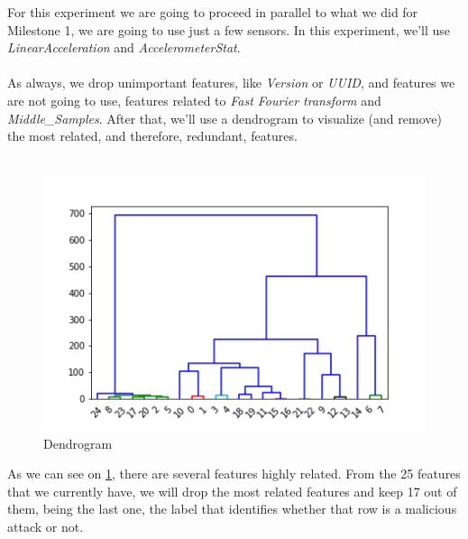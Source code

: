 \documentclass[idxtotoc,hyperref,openany]{labbook} %
\begin{document}

For this experiment we are going to proceed in parallel to what we did for Milestone 1, we are going to use just a few sensors. In this experiment, we'll use \textit{LinearAcceleration} and \textit{AccelerometerStat}.\\\\
As always, we drop unimportant features, like \textit{Version} or \textit{UUID}, and features we are not going to use, features related to \textit{Fast Fourier transform} and \textit{Middle\_Samples}. After that, we'll use a dendrogram to visualize (and remove) the most related, and therefore, redundant, features.\\\\

\begin{figure}[h]
\includegraphics[width=0.9\linewidth]{Milestone3/Drendrogram_accelerometer.png}
\setlength\belowcaptionskip{-10pt}
\caption{Dendrogram}
\label{Milestone 3 Accelerometer Dendrogram}
\end{figure}

As we can see on \ref{Milestone 3 Accelerometer Dendrogram}, there are several features highly related. From the 25 features that we currently have, we will drop the most related features and keep 17 out of them, being the last one, the label that identifies whether that row is a malicious attack or not.
\end{document}
